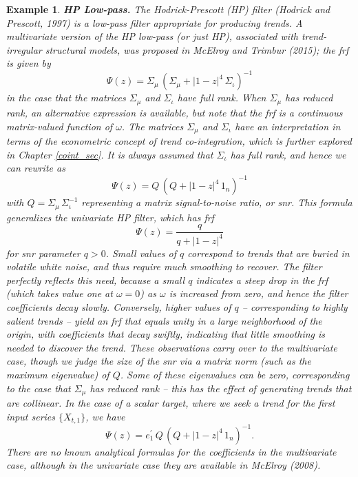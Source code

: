 \documentclass[a4paper]{book}
\newtheorem{Example}{Example}
\begin{document}
\begin{Example} {\bf HP Low-pass.} \rm
\label{exam:hp-low}
 The Hodrick-Prescott (HP) filter (Hodrick
and Prescott, 1997) is a low-pass filter appropriate for producing trends.
 A multivariate version of the HP low-pass (or just HP), 
 associated with trend-irregular structural models,
 was proposed in McElroy and Trimbur (2015); the frf is given by
\[
   \Psi (z) = \Sigma_{\mu} \, { \left( \Sigma_{\mu} + {|1 - z|}^4 \, \Sigma_{\iota} 
	\right) }^{-1}
\]
 in the case that the matrices $\Sigma_{\mu}$ and $\Sigma_{\iota}$ have full rank.  
  When $\Sigma_{\mu}$ has reduced rank, an alternative expression is available,
 but note that the frf is a continuous matrix-valued function of $\omega$.
The matrices $\Sigma_{\mu}$ and $\Sigma_{\iota}$ have an interpretation in terms
 of the econometric concept of trend co-integration, which is further explored
 in Chapter \ref{coint_sec}.  It is always assumed that
 $\Sigma_{\iota}$ has full rank, and hence 
 we can rewrite as
\[
  \Psi (z) = Q \, { \left( Q + {| 1 - z|}^4 \, 1_n \right) }^{-1}
\]
 with $Q = \Sigma_{\mu} \, \Sigma_{\iota}^{-1}$ representing a matrix
 {\em signal-to-noise ratio}, or snr.  This formula 
  generalizes the univariate HP filter, which has frf
\[
 \Psi (z) = \frac{ q}{ q + {| 1 - z|}^4 }
\]
 for snr parameter $q > 0$.  Small values of $q$ correspond to trends that are
 buried in volatile white noise, and thus require much smoothing to recover.
 The filter perfectly reflects this need, because a small $q$ indicates a steep
 drop in the frf (which takes value one at $\omega = 0$) as $\omega$ is increased
 from zero, and hence the filter coefficients decay slowly.  Conversely, higher values
 of $q$ -- corresponding to highly salient trends -- yield an frf that equals unity
 in a large neighborhood of the origin, with coefficients that decay swiftly,
 indicating that little smoothing is needed to discover the trend.  These observations
 carry over to the multivariate case, though we judge the size of the snr via a
 matrix norm (such as the maximum eigenvalue) of $Q$.  Some of these eigenvalues can be
 zero, corresponding to the case that $\Sigma_{\mu}$ has reduced rank -- this has the
 effect of generating trends that are collinear.  In the case of a scalar target,
 where we seek a trend for the first input series $\{ X_{t,1} \}$,  we have 
\[
  \Psi (z) = e_1^{\prime} \, Q \, { \left( Q + {| 1 - z|}^4 \, 1_n \right) }^{-1}.
\]
 There are no known analytical formulas for the coefficients in the multivariate case,
 although in the univariate case they are available in McElroy (2008).
\end{Example}
\end{document}
